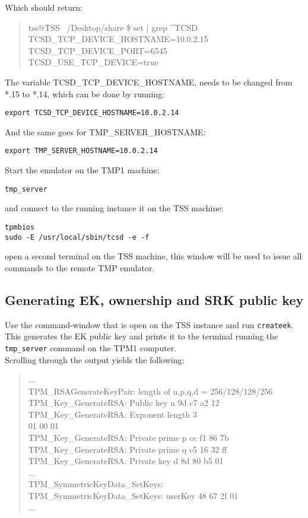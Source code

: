 \documentclass[10pt]{article}
\newcommand{\command}[1]{\texttt{#1}}
\begin{document}
      Which should return:

      \begin{quote}
        tss@TSS ~/Desktop/share \$ set | grep \textasciicircum TCSD\\
        TCSD\_TCP\_DEVICE\_HOSTNAME=10.0.2.15\\
        TCSD\_TCP\_DEVICE\_PORT=6545\\
        TCSD\_USE\_TCP\_DEVICE=true
      \end{quote}

      The variable TCSD\_TCP\_DEVICE\_HOSTNAME, needs to be changed from *.15 to
      *.14, which can be done by running:

      \command{export TCSD\_TCP\_DEVICE\_HOSTNAME=10.0.2.14}

      And the same goes for TMP\_SERVER\_HOSTNAME:

      \command{export TMP\_SERVER\_HOSTNAME=10.0.2.14}

      Start the emulator on the TMP1 machine:

      \command{tmp\_server}

      and connect to the running instance it on the TSS machine:

      \command{tpmbios} \\
      \command{sudo -E /usr/local/sbin/tcsd -e -f}

      open a second terminal on the TSS machine, this window will be used to
      issue all commands to the remote TMP emulator.

    \subsection{Generating EK, ownership and SRK public key}

      Use the command-window that is open on the TSS instance and run
      \command{createek}. This generates the EK public key and prints
      it to the terminal running the \command{tmp\_server} command
      on the TPM1 computer. \\

      Scrolling through the output yields the following:

      \begin{quote}
        ...\\
        TPM\_RSAGenerateKeyPair: length of n,p,q,d = 256/128/128/256\\
        TPM\_Key\_GenerateRSA: Public key n 9d c7 a2 12\\
        TPM\_Key\_GenerateRSA: Exponent length 3\\
        01 00 01\\
        TPM\_Key\_GenerateRSA: Private prime p cc f1 86 7b\\
        TPM\_Key\_GenerateRSA: Private prime q c5 16 32 ff\\
        TPM\_Key\_GenerateRSA: Private key d 8d 80 b5 01\\
        ...\\
        TPM\_SymmetricKeyData\_SetKeys:\\
        TPM\_SymmetricKeyData\_SetKeys: userKey 48 67 2f 01\\
        ...
      \end{quote}
\end{document}
